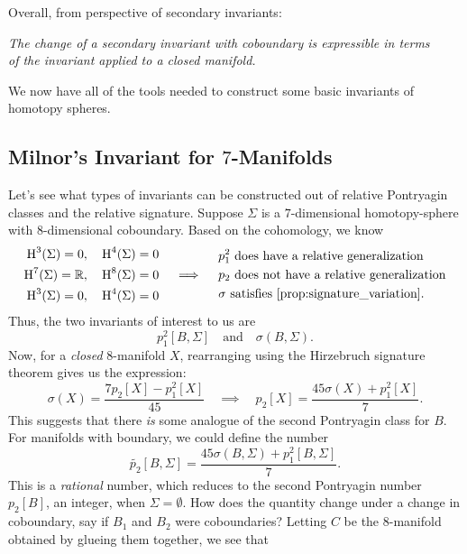 Overall, from perspective of secondary invariants:
\begin{center}
	\textsl{The change of a secondary invariant with coboundary is expressible in terms}\\
	\textsl{of the invariant applied to a closed manifold.}
\end{center}

We now have all of the tools needed to construct some basic invariants of homotopy spheres.

\subsection*{Milnor's Invariant for $7$-Manifolds}

Let's see what types of invariants can be constructed out of relative Pontryagin classes and the relative signature. Suppose $\Sigma$ is a $7$-dimensional homotopy-sphere with $8$-dimensional coboundary.  Based on the cohomology, we know
\[
	\begin{aligned}
		\H^3(\Sigma)=0,  & \quad \H^4(\Sigma)=0 \\
		\H^7(\Sigma)=\R, & \quad \H^8(\Sigma)=0 \\
		\H^3(\Sigma)=0,  & \quad \H^4(\Sigma)=0
	\end{aligned}
	\quad\implies\quad
	\begin{aligned}
		 & p_1^2\textrm{ does have a relative generalization}         \\
		 & p_2\textrm{ does not have a relative generalization}       \\
		 & \sigma\textrm{ satisfies \cref{prop:signature_variation}.}
	\end{aligned}
\]
Thus, the two invariants of interest to us are
\[
	p_1^2[B,\Sigma]
	\quad\textrm{and}\quad
	\sigma(B, \Sigma).
\]
Now, for a \emph{closed} $8$-manifold $X$, rearranging using the Hirzebruch signature theorem gives us the expression:
\begin{equation}\label{eq:7-manifold_rearrangement}
	\sigma(X) = \frac{7p_2[X] - p_1^2[X]}{45}
	\quad\implies\quad
	p_2[X] = \frac{45\sigma(X) + p_1^2[X]}{7}.
\end{equation}
This suggests that there \emph{is} some analogue of the second Pontryagin class for $B$. For manifolds with boundary, we could define the number
\[
	\widetilde{p_2}[B, \Sigma] = \frac{45\sigma(B, \Sigma) + p_1^2[B, \Sigma]}{7}.
\]
This is a \emph{rational} number,
which reduces to the second Pontryagin number $p_2[B]$, an integer, when $\Sigma=\emptyset$. How does the quantity change under a change in coboundary, say if $B_1$ and $B_2$ were coboundaries? Letting $C$ be the $8$-manifold obtained by glueing them together, we see that
